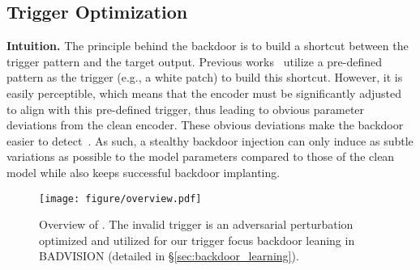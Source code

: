 \begin{table}[t]
    \centering
    \vspace{-10pt}
    \caption{Attack effectiveness of two poisoning attacks on two CLIP vision encoders. Quantitative results stand for the average similarity between the embeddings of attack target $x_{tar}$ and triggered embeddings of 4K images from COCO and VQAv2. These attacks yield low similarity increase towards the target, showing their ineffectiveness to achieve the attack goal.}
    \label{tab:limitation}
    \vspace{-10pt}
\end{table}
\subsection{Trigger Optimization}
\label{sec:trigger_optimization}
\textbf{Intuition.} 
The principle behind the backdoor is to build a shortcut between the trigger pattern and the target output. Previous works~\cite{carlini2021poisoning,jia2022badencoder} utilize a pre-defined pattern as the trigger (e.g., a white patch) to build this shortcut. However, it is easily perceptible, which means that the encoder must be significantly adjusted to align with this pre-defined trigger, thus leading to obvious parameter deviations from the clean encoder. These obvious deviations make the backdoor easier to detect~\cite{feng2023detecting,liang2024badclip}. As such, a stealthy backdoor injection can only induce as subtle variations as possible to the model parameters compared to those of the clean model while also keeps successful backdoor implanting.
\begin{figure}[t]
    \centering
    \vspace{-10pt}
    \texttt{[image: figure/overview.pdf]}
    \caption{Overview of \project. The invalid trigger is an adversarial perturbation optimized and utilized for our trigger focus backdoor leaning in BADVISION (detailed in \S\ref{sec:backdoor_learning}).}
    \label{fig:overview}
    \vspace{-15pt}
\end{figure}

